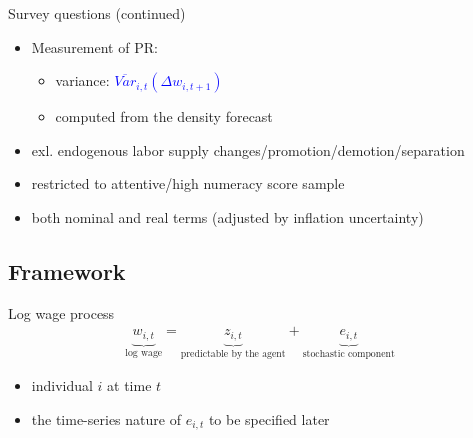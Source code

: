 \documentclass{beamer}
\begin{document}
\begin{frame}{Survey questions (continued)}
	\begin{itemize}
	
		\item  Measurement of PR: 
		\begin{itemize}
			\item variance: \textcolor{blue}{$\overline {Var}_{i,t}(\Delta w_{i,t+1})$}  
			\item computed from the density forecast
		\end{itemize}
		
	\item exl. endogenous labor supply changes/promotion/demotion/separation 

\item restricted to attentive/high numeracy score sample
\item both nominal and real terms (adjusted by inflation uncertainty)
\end{itemize}
\end{frame}


\subsection{Framework}

\begin{frame}{Log wage process}
	\begin{equation*}
		\begin{split}
			\underbrace{w_{i,t}}_{\text{log wage}} = \underbrace{z_{i,t}}_{\text{predictable by the agent}}  + \underbrace{e_{i,t}}_{\text{stochastic component}}
		\end{split} 
	\end{equation*}
	
	\begin{itemize}
		\item individual \(i\) at time \(t\) 
		\item the time-series nature of $e_{i,t}$ to be specified later
	\end{itemize}
\end{frame}
\end{document}
